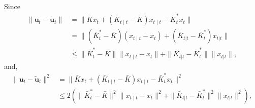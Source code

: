 \documentclass[letterpaper, 10 pt, conference]{ieeeconf}  %
\newcommand{\contTilde}[1]{\mathbf{\tilde{#1}}}
\begin{document}
Since
\begin{align*}
    \|\mathbf{u}_{t} - \contTilde{u}_{t}\|
    &= \|\bar{K}x_{t} + (\bar{K}_{t\mid t}-\bar{K})x_{t\mid t} - \bar{K}_{t}^{*}x_{t}\|\\
    &= \|(\bar{K}_{t}^{*}-\bar{K})(x_{t\mid t}-x_{t})  + (\bar{K}_{t|t}-\bar{K}_{t}^{*})x_{t|t}\|\\
    &\leq \|\bar{K}_{t}^{*}-\bar{K}\|\|x_{t\mid t}-x_{t}\|  + \|\bar{K}_{t|t}-\bar{K}_{t}^{*}\| \|x_{t|t}\|,
\end{align*}
and,
\begin{align*}
    \|\mathbf{u}_{t} - \contTilde{u}_{t}\|^{2}
    &= \|\bar{K}x_{t} + (\bar{K}_{t\mid t}-\bar{K})x_{t\mid t} - \bar{K}_{t}^{*}x_{t}\|^{2}\\
    &\leq 2(\|\bar{K}_{t}^{*}-\bar{K}\|^{2}\|x_{t\mid t}-x_{t}\|^{2}  + \|\bar{K}_{t|t}-\bar{K}_{t}^{*}\|^{2} \|x_{t|t}\|^{2}),
\end{align*}
\end{document}
